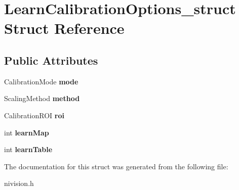 \hypertarget{structLearnCalibrationOptions__struct}{\section{\-Learn\-Calibration\-Options\-\_\-struct \-Struct \-Reference}
\label{structLearnCalibrationOptions__struct}
}
\subsection*{\-Public \-Attributes}
\begin{DoxyCompactItemize}
\item 
\hypertarget{structLearnCalibrationOptions__struct_a5bb08c9b69f8ef6770ac905460c848c8}{\-Calibration\-Mode {\bfseries mode}}\label{structLearnCalibrationOptions__struct_a5bb08c9b69f8ef6770ac905460c848c8}

\item 
\hypertarget{structLearnCalibrationOptions__struct_a6cdc735b984faf48c3c0517930bd73ac}{\-Scaling\-Method {\bfseries method}}\label{structLearnCalibrationOptions__struct_a6cdc735b984faf48c3c0517930bd73ac}

\item 
\hypertarget{structLearnCalibrationOptions__struct_af6a356b33bfa2134b863d9063299835e}{\-Calibration\-R\-O\-I {\bfseries roi}}\label{structLearnCalibrationOptions__struct_af6a356b33bfa2134b863d9063299835e}

\item 
\hypertarget{structLearnCalibrationOptions__struct_af6c3a5fed15a1a0abc4cad5987cda3fa}{int {\bfseries learn\-Map}}\label{structLearnCalibrationOptions__struct_af6c3a5fed15a1a0abc4cad5987cda3fa}

\item 
\hypertarget{structLearnCalibrationOptions__struct_a6ae03a56adc36f78670063049fa2fd6e}{int {\bfseries learn\-Table}}\label{structLearnCalibrationOptions__struct_a6ae03a56adc36f78670063049fa2fd6e}

\end{DoxyCompactItemize}


\-The documentation for this struct was generated from the following file\-:\begin{DoxyCompactItemize}
\item 
nivision.\-h\end{DoxyCompactItemize}
